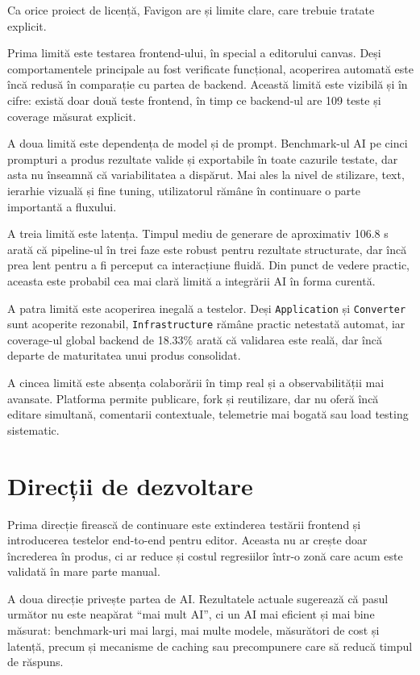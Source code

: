 Ca orice proiect de licență, Favigon are și limite clare, care trebuie tratate explicit.

Prima limită este testarea frontend-ului, în special a editorului canvas. Deși comportamentele principale au fost verificate funcțional, acoperirea automată este încă redusă în comparație cu partea de backend. Această limită este vizibilă și în cifre: există doar două teste frontend, în timp ce backend-ul are 109 teste și coverage măsurat explicit.

A doua limită este dependența de model și de prompt. Benchmark-ul AI pe cinci prompturi a produs rezultate valide și exportabile în toate cazurile testate, dar asta nu înseamnă că variabilitatea a dispărut. Mai ales la nivel de stilizare, text, ierarhie vizuală și fine tuning, utilizatorul rămâne în continuare o parte importantă a fluxului.

A treia limită este latența. Timpul mediu de generare de aproximativ 106.8 s arată că pipeline-ul în trei faze este robust pentru rezultate structurate, dar încă prea lent pentru a fi perceput ca interacțiune fluidă. Din punct de vedere practic, aceasta este probabil cea mai clară limită a integrării AI în forma curentă.

A patra limită este acoperirea inegală a testelor. Deși \texttt{Application} și \texttt{Converter} sunt acoperite rezonabil, \texttt{Infrastructure} rămâne practic netestată automat, iar coverage-ul global backend de 18.33\% arată că validarea este reală, dar încă departe de maturitatea unui produs consolidat.

A cincea limită este absența colaborării în timp real și a observabilității mai avansate. Platforma permite publicare, fork și reutilizare, dar nu oferă încă editare simultană, comentarii contextuale, telemetrie mai bogată sau load testing sistematic.

\section{Direcții de dezvoltare}

Prima direcție firească de continuare este extinderea testării frontend și introducerea testelor end-to-end pentru editor. Aceasta nu ar crește doar încrederea în produs, ci ar reduce și costul regresiilor într-o zonă care acum este validată în mare parte manual.

A doua direcție privește partea de AI. Rezultatele actuale sugerează că pasul următor nu este neapărat ``mai mult AI'', ci un AI mai eficient și mai bine măsurat: benchmark-uri mai largi, mai multe modele, măsurători de cost și latență, precum și mecanisme de caching sau precompunere care să reducă timpul de răspuns.

